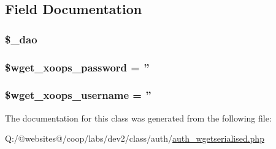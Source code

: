 \subsection{Field Documentation}
\hypertarget{class_xortify_auth_wgetserialised_a12a029c610f699b4b25e79a1f64a3485}{
\subsubsection[{\$\-\_\-dao}]{\setlength{\rightskip}{0pt plus 5cm}\$\-\_\-dao}}\label{class_xortify_auth_wgetserialised_a12a029c610f699b4b25e79a1f64a3485}
\hypertarget{class_xortify_auth_wgetserialised_ab9145a618042e8282ecb90d5f634311f}{
\subsubsection[{\$wget\-\_\-xoops\-\_\-password}]{\setlength{\rightskip}{0pt plus 5cm}\$wget\-\_\-xoops\-\_\-password = ''}}\label{class_xortify_auth_wgetserialised_ab9145a618042e8282ecb90d5f634311f}
\hypertarget{class_xortify_auth_wgetserialised_a237f5dcc3c161c5b1909327a90b56618}{
\subsubsection[{\$wget\-\_\-xoops\-\_\-username}]{\setlength{\rightskip}{0pt plus 5cm}\$wget\-\_\-xoops\-\_\-username = ''}}\label{class_xortify_auth_wgetserialised_a237f5dcc3c161c5b1909327a90b56618}


The documentation for this class was generated from the following file\-:\begin{DoxyCompactItemize}
\item 
Q\-:/@websites@/coop/labs/dev2/class/auth/\hyperlink{auth__wgetserialised_8php}{auth\-\_\-wgetserialised.\-php}\end{DoxyCompactItemize}

